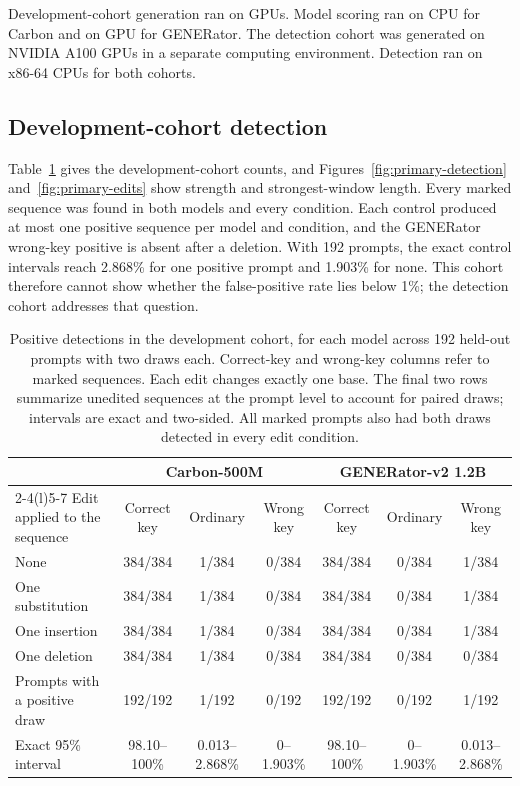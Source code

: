 \documentclass[10pt,twocolumn]{article}
\begin{document}
Development-cohort generation ran on GPUs. Model scoring ran on CPU for Carbon and on GPU for
GENERator. The detection cohort was generated on NVIDIA A100 GPUs in a separate computing
environment. Detection ran on x86-64 CPUs for both cohorts.

\subsection{Development-cohort detection}
\label{supp:development}

Table~\ref{tab:detection} gives the development-cohort counts, and
Figures~\ref{fig:primary-detection} and~\ref{fig:primary-edits} show strength and strongest-window
length. Every marked sequence was found in both models and every condition. Each control produced at
most one positive sequence per model and condition, and the GENERator wrong-key positive is absent
after a deletion. With 192 prompts, the exact control intervals reach 2.868\% for one positive
prompt and 1.903\% for none. This cohort therefore cannot show whether the false-positive rate lies
below 1\%; the detection cohort addresses that question.

\begin{table}[tp]
\centering
\caption{Positive detections in the development cohort, for each model across 192 held-out prompts
with two draws each. Correct-key and wrong-key columns refer to marked sequences. Each edit changes
exactly one base. The final two rows summarize unedited sequences at the prompt level to account for
paired draws; intervals are exact and two-sided. All marked prompts also had both draws detected in
every edit condition.}
\label{tab:detection}
\small
\setlength{\tabcolsep}{4pt}
\renewcommand{\arraystretch}{1.08}
\begin{tabular}{@{}lccc@{\hspace{12pt}}ccc@{}}
\toprule
& \multicolumn{3}{c}{\textbf{Carbon-500M}} & \multicolumn{3}{c}{\textbf{GENERator-v2 1.2B}} \\
\cmidrule(lr){2-4}\cmidrule(l){5-7}
Edit applied to the sequence & Correct key & Ordinary & Wrong key & Correct key & Ordinary & Wrong key \\
\midrule
None                 & 384/384 & 1/384 & 0/384 & 384/384 & 0/384 & 1/384 \\
One substitution     & 384/384 & 1/384 & 0/384 & 384/384 & 0/384 & 1/384 \\
One insertion        & 384/384 & 1/384 & 0/384 & 384/384 & 0/384 & 1/384 \\
One deletion         & 384/384 & 1/384 & 0/384 & 384/384 & 0/384 & 0/384 \\
\midrule
Prompts with a positive draw & 192/192 & 1/192 & 0/192 & 192/192 & 0/192 & 1/192 \\
Exact 95\% interval  & 98.10--100\% & 0.013--2.868\% & 0--1.903\% & 98.10--100\% & 0--1.903\% & 0.013--2.868\% \\
\bottomrule
\end{tabular}
\end{table}
\end{document}
